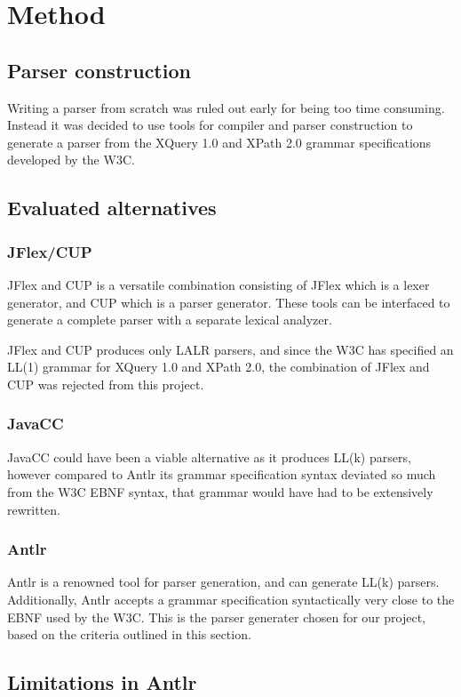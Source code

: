 \section{Method}
\subsection{Parser construction}
Writing a parser from scratch was ruled out early for being too time consuming.
Instead it was decided to use tools for compiler and parser construction to
generate a parser from the XQuery 1.0 and XPath 2.0 grammar specifications
developed by the W3C.

\subsection{Evaluated alternatives}
\subsubsection{JFlex/CUP}
JFlex and CUP is a versatile combination consisting of JFlex which is a lexer
generator, and CUP which is a parser generator. These tools can be interfaced to
generate a complete parser with a separate lexical analyzer.

JFlex and CUP produces only LALR parsers, and since the W3C has specified an
LL(1) grammar for XQuery 1.0 and XPath 2.0, the combination of JFlex and CUP was
rejected from this project.

\subsubsection{JavaCC}
JavaCC could have been a viable alternative as it produces LL(k) parsers,
however compared to Antlr its grammar specification syntax deviated so much
from the W3C EBNF syntax, that grammar would have had to be extensively
rewritten.

\subsubsection{Antlr}
Antlr is a renowned tool for parser generation, and can generate LL(k) parsers.
Additionally, Antlr accepts a grammar specification syntactically very close to
the EBNF used by the W3C. This is the parser generater chosen for our project,
based on the criteria outlined in this section.

\subsection{Limitations in Antlr}
